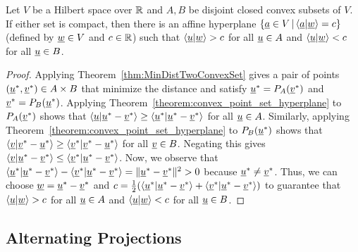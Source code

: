 \begin{theorem}
Let $V$ be a Hilbert space over $\mathbb{R}$ and $A,B$ be disjoint closed convex subsets of $V$.
If either set is compact, then there is an affine hyperplane $\{ \underline{a} \in V \,|\, \langle \underline{a} | \underline{w} \rangle = c \}$ (defined by $\underline{w} \in V$ and $c\in \mathbb{R}$) such that $\langle \underline{u} | \underline{w} \rangle > c$ for all $\underline{u} \in A$ and $\langle \underline{u} | \underline{w} \rangle < c$ for all $\underline{u} \in B$.
\end{theorem}
\begin{proof}
Applying Theorem~\ref{thm:MinDistTwoConvexSet} gives a pair of points $(\underline{u}^*,\underline{v}^*) \in A \times B$ that minimize the distance and satisfy $\underline{u}^* = P_A (\underline{v}^*)$ and $\underline{v}^* = P_B (\underline{u}^*)$.
Applying Theorem~\ref{theorem:convex_point_set_hyperplane} to $P_A (\underline{v}^*)$ shows that $\langle \underline{u} | \underline{u}^* - \underline{v}^* \rangle \geq \langle \underline{u}^* | \underline{u}^* - \underline{v}^* \rangle$ for all $\underline{u} \in A$.
Similarly, applying Theorem~\ref{theorem:convex_point_set_hyperplane} to $P_B (\underline{u}^*)$ shows that $\langle \underline{v} | \underline{v}^* - \underline{u}^* \rangle \geq \langle \underline{v}^* | \underline{v}^* - \underline{u}^* \rangle$ for all $\underline{v} \in B$.
Negating this gives $\langle \underline{v} | \underline{u}^* - \underline{v}^* \rangle \leq \langle \underline{v}^* | \underline{u}^* - \underline{v}^* \rangle$.
Now, we observe that  $\langle \underline{u}^* | \underline{u}^* - \underline{v}^* \rangle - \langle \underline{v}^* | \underline{u}^* - \underline{v}^* \rangle = \| \underline{u}^* - \underline{v}^* \|^2 > 0$ because $\underline{u}^* \neq \underline{v}^*$.
Thus, we can choose $\underline{w} = \underline{u}^* - \underline{v}^*$ and $c=\frac{1}{2}(\langle \underline{u}^* | \underline{u}^* - \underline{v}^* \rangle + \langle \underline{v}^* | \underline{u}^* - \underline{v}^* \rangle)$  to guarantee that $\langle \underline{u} | \underline{w} \rangle > c$ for all $\underline{u} \in A$ and $\langle \underline{u} | \underline{w} \rangle < c$ for all $\underline{u} \in B$.
\end{proof}

\iffalse
\subsection{Alternating Projections}

